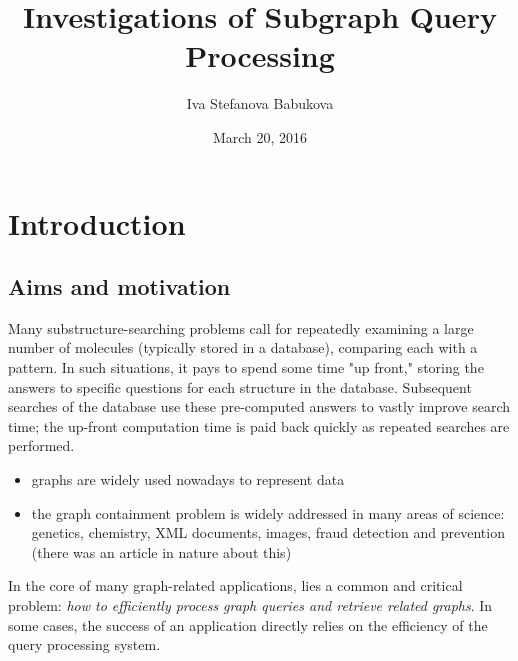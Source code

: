\documentclass{l4proj}
\theoremstyle{definition}
\begin{document}
\title{Investigations of Subgraph Query Processing}
\author{Iva Stefanova Babukova}
\date{March 20, 2016}
\maketitle

\begin{abstract}


\end{abstract}

\educationalconsent
%
%
\tableofcontents
\chapter{Introduction}

    \section{Aims and motivation}
    
    Many substructure-searching problems call for repeatedly examining a large number of molecules (typically stored in a database), comparing each with a pattern. In such situations, it pays to spend some time "up front," storing the answers to specific questions for each structure in the database. Subsequent searches of the database use these pre-computed answers to vastly improve search time; the up-front computation time is paid back quickly as repeated searches are performed.


    
        \begin{itemize}
            \item graphs are widely used nowadays to represent data
            \item the graph containment problem is widely addressed in many areas of science: genetics, chemistry, XML documents, images, fraud detection and prevention (there was an article in nature about this)
        \end{itemize}
        
        In the core of many graph-related applications, lies a common and critical problem: \textit{how to efficiently process graph queries and retrieve related graphs}. In some cases, the success of an application directly relies on the efficiency of the query processing system.  
        
\end{document}
